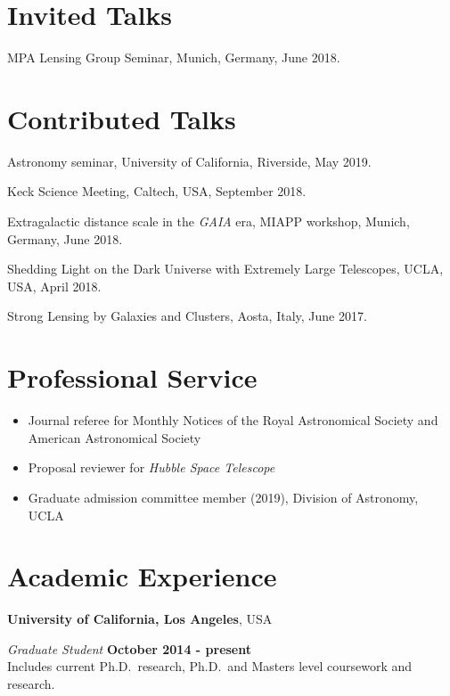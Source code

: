 \documentclass[margin, line]{res}
\begin{document}
\begin{resume}
\section{\sc Invited Talks}
\begin{etaremune}
	\item MPA Lensing Group Seminar, Munich, Germany, June 2018.
\end{etaremune}


\section{\sc Contributed Talks}
\begin{etaremune}
	\item Astronomy seminar, University of California, Riverside, May 2019.
	\item Keck Science Meeting, Caltech, USA, September 2018.
	\item Extragalactic distance scale in the \textit{GAIA} era, MIAPP workshop, Munich, Germany, June 2018.
	\item Shedding Light on the Dark Universe with Extremely Large Telescopes, UCLA, USA, April 2018.
	\item Strong Lensing by Galaxies and Clusters, Aosta, Italy, June 2017.
\end{etaremune}


\section{\sc Professional Service}
\begin{itemize}
\item Journal referee for Monthly Notices of the Royal Astronomical Society and American Astronomical Society
\item Proposal reviewer for \textit{Hubble Space Telescope}
\item Graduate admission committee member (2019), Division of Astronomy, UCLA
\end{itemize}

\section{\sc Academic Experience}
{\bf University of California, Los Angeles}, USA

\vspace{-.3cm}
{\em Graduate Student} \hfill {\bf October 2014 - present}\\
Includes current Ph.D.~research, Ph.D.~and Masters level coursework and
research.



\end{resume}
\end{document}
